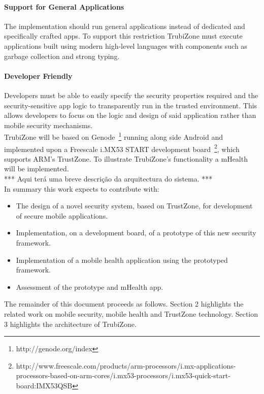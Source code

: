 \paragraph*{\textbf{Support for General Applications\\}}
The implementation should run general applications instead of dedicated and specifically crafted apps. To support this restriction TrubiZone must execute applications built using modern high-level languages with components such as garbage collection and strong typing.

\paragraph*{\textbf{Developer Friendly\\}}
Developers must be able to easily specify the security properties required and the security-sensitive app logic to transparently run in the trusted environment. This allows developers to focus on the logic and design of said application rather than mobile security mechanisms.\\

TrubiZone will be based on Genode~\footnote{http://genode.org/index} running along side Android and implemented upon a Freescale i.MX53 START development board~\footnote{http://www.freescale.com/products/arm-processors/i.mx-applications-processors-based-on-arm-cores/i.mx53-processors/i.mx53-quick-start-board:IMX53QSB}, which supports ARM's TrustZone. To illustrate TrubiZone's functionality a \ac{mHealth} will be implemented.\\

*** Aqui terá uma breve descrição da arquitectura do sistema. ***\\

In summary this work expects to contribute with:
\begin{itemize}
	\item The design of a novel security system, based on TrustZone, for development of secure mobile applications.
	\item Implementation, on a development board, of a prototype of this new security framework.
	\item Implementation of a mobile health application using the prototyped framework.
	\item Assessment of the prototype and \ac{mHealth} app.
\end{itemize}

The remainder of this document proceeds as follows. Section 2 highlights the related work on mobile security, mobile health and TrustZone technology. Section 3 highlights the architecture of TrubiZone.
